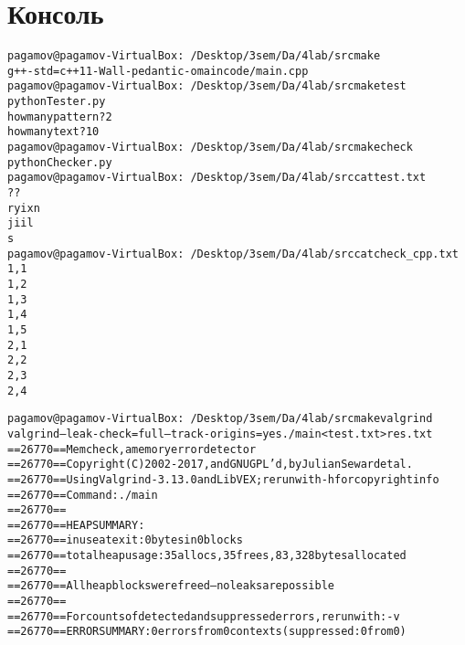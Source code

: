 \pagebreak

\section{Консоль}
\begin{alltt}
pagamov@pagamov-VirtualBox:~/Desktop/3sem/Da/4lab/src make
g++ -std=c++11 -Wall -pedantic -o main code/main.cpp
pagamov@pagamov-VirtualBox:~/Desktop/3sem/Da/4lab/src make test
python Tester.py
how many pattern? 2
how many text? 10
pagamov@pagamov-VirtualBox:~/Desktop/3sem/Da/4lab/src make check
python Checker.py
pagamov@pagamov-VirtualBox:~/Desktop/3sem/Da/4lab/src cat test.txt 
? ? 
r y i x n 
j i i l 
s 
pagamov@pagamov-VirtualBox:~/Desktop/3sem/Da/4lab/src cat check_cpp.txt 
1, 1
1, 2
1, 3
1, 4
1, 5
2, 1
2, 2
2, 3
2, 4

pagamov@pagamov-VirtualBox:~/Desktop/3sem/Da/4lab/src make valgrind
valgrind --leak-check=full --track-origins=yes ./main < test.txt > res.txt
==26770== Memcheck, a memory error detector
==26770== Copyright (C) 2002-2017, and GNU GPL'd, by Julian Seward et al.
==26770== Using Valgrind-3.13.0 and LibVEX; rerun with -h for copyright info
==26770== Command: ./main
==26770== 
==26770== HEAP SUMMARY:
==26770==     in use at exit: 0 bytes in 0 blocks
==26770==   total heap usage: 35 allocs, 35 frees, 83,328 bytes allocated
==26770== 
==26770== All heap blocks were freed -- no leaks are possible
==26770== 
==26770== For counts of detected and suppressed errors, rerun with: -v
==26770== ERROR SUMMARY: 0 errors from 0 contexts (suppressed: 0 from 0)
\end{alltt}

\pagebreak